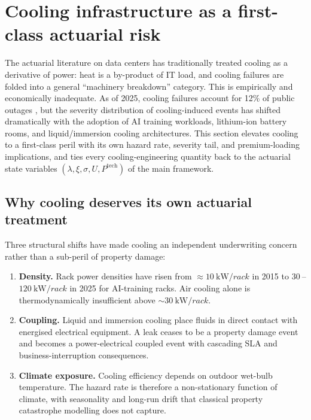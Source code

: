 \section{Cooling infrastructure as a first-class actuarial risk}\label{sec:cooling}

The actuarial literature on data centers has traditionally treated
cooling as a derivative of power: heat is a by-product of IT load, and
cooling failures are folded into a general ``machinery breakdown''
category. This is empirically and economically inadequate. As of
2025, cooling failures account for 12\% of public outages
\citep{Uptime2024}, but the severity distribution of cooling-induced
events has shifted dramatically with the adoption of AI training
workloads, lithium-ion battery rooms, and liquid/immersion cooling
architectures. This section elevates cooling to a first-class peril
with its own hazard rate, severity tail, and premium-loading
implications, and ties every cooling-engineering quantity back to the
actuarial state variables $(\lambda, \xi, \sigma, U, P^{\mathrm{tech}})$
of the main framework.

\subsection{Why cooling deserves its own actuarial treatment}\label{ss:cool-why}

Three structural shifts have made cooling an independent
underwriting concern rather than a sub-peril of property damage:

\begin{enumerate}[leftmargin=*,nosep,topsep=4pt]
   \item \textbf{Density.} Rack power densities have risen from
         $\approx\SI{10}{\kilo\watt\per rack}$ in 2015 to
         $\SI{30}{}$--$\SI{120}{\kilo\watt\per rack}$ in 2025 for
         AI-training racks. Air cooling alone is thermodynamically
         insufficient above $\sim\SI{30}{\kilo\watt\per rack}$.
   \item \textbf{Coupling.} Liquid and immersion cooling place fluids
         in direct contact with energised electrical equipment.
         A leak ceases to be a property damage event and becomes a
         power-electrical coupled event with cascading SLA and
         business-interruption consequences.
   \item \textbf{Climate exposure.} Cooling efficiency depends on
         outdoor wet-bulb temperature. The hazard rate is therefore
         a non-stationary function of climate, with seasonality and
         long-run drift that classical property catastrophe modelling
         does not capture.
\end{enumerate}

